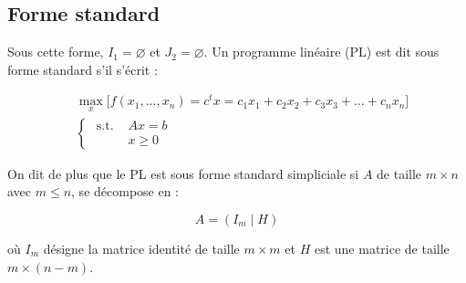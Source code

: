 \documentclass[a4paper,12pt,openany]{book}
\theoremstyle{plain}
\theoremstyle{definition}
\theoremstyle{remark}
\theoremstyle{nbstyle}
\begin{document}
	\subsection{Forme standard}
	
	Sous cette forme, $I_{1}=\varnothing$ et $J_{2}=\varnothing$. Un programme linéaire (PL) est dit sous forme standard s'il s'écrit :
	
	\begin{align*}
	& \displaystyle\max_{x}\Big[f\left(x_{1}, \ldots, x_{n}\right)=c^{t} x=c_{1} x_{1}+c_{2} x_{2}+c_{3} x_{3}+\ldots +c_{n} x_{n}\Big] \\
	& \left\{\begin{aligned}
	\text { s.t. } & A x=b \\
	& x \geq 0
	\end{aligned}\right. \tag{2.3}
	\end{align*}
	
	
	On dit de plus que le PL est sous forme standard simpliciale si $A$ de taille $m \times n$ avec $m \leq n$, se décompose en :
	
	$$
	A=\left(I_{m} \mid H\right)
	$$
	
	où $I_{m}$ désigne la matrice identité de taille $m \times m$ et $H$ est une matrice de taille $m \times(n-m)$.
\end{document}
